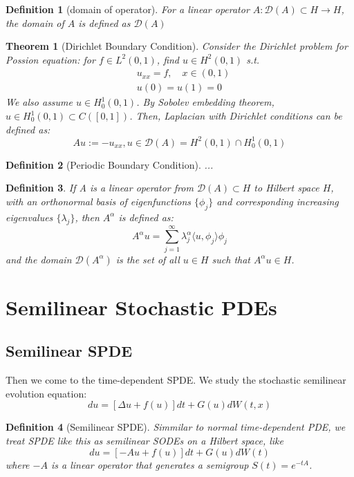 \documentclass{article}
\newtheorem{theorem}{Theorem}
\newtheorem{definition}{Definition}
\begin{document}
\begin{definition}[domain of operator]
    For a linear operator $A:\mathcal{D}(A)\subset H\rightarrow H$, the domain of $A$ is defined as $\mathcal{D}(A)$
\end{definition}
\begin{theorem}[Dirichlet Boundary Condition]
    Consider the Dirichlet problem for Possion equation: for $f\in L^2(0, 1)$, find $u\in H^2(0, 1)$ s.t.
    \begin{equation}
        \begin{aligned}
            &u_{xx} = f, \quad x\in (0, 1)\\
            &u(0) = u(1) = 0
        \end{aligned}
    \end{equation}
    We also assume $u\in H^1_0(0, 1)$. By Sobolev embedding theorem, $u\in H^1_0(0, 1)\subset C([0, 1])$. 
    Then, Laplacian with Dirichlet conditions can be defined as:
    \begin{equation}
        Au:=-u_{xx}, u\in \mathcal{D}(A)=H^2(0,1)\cap H_0^1(0,1)
    \end{equation}
\end{theorem}


\begin{definition}[Periodic Boundary Condition]
    ...
\end{definition}

\begin{definition}
    If A is a linear operator from $\mathcal{D}(A) \subset H$ to Hilbert space $H$, with an orthonormal basis of eigenfunctions $\{\phi_j\}$ 
    and corresponding increasing eigenvalues $\{\lambda_j\}$, 
    then $A^{\alpha}$ is defined as:
    \begin{equation}
        A^{\alpha}u = \sum_{j=1}^\infty \lambda_j^\alpha \langle u, \phi_j\rangle \phi_j
    \end{equation}
    and the domain $\mathcal{D}(A^{\alpha})$ is the set of all $u\in H$ such that $A^{\alpha}u\in H$.
\end{definition}


\section{Semilinear Stochastic PDEs}
\subsection{Semilinear SPDE}
Then we come to the time-dependent SPDE. We study the stochastic semilinear evolution equation:
\begin{equation}
    du = [\Delta u + f(u)]dt + G(u)dW(t, x)
\end{equation}
\begin{definition}[Semilinear SPDE]
    Simmilar to normal time-dependent PDE, we treat SPDE like this as semilinear SODEs on a Hilbert space, like
\begin{equation}
    du = [-Au+f(u)]dt + G(u)dW(t)
\end{equation}
where $-A$ is a linear operator that generates a semigroup $S(t)=e^{-tA}$. 
\end{definition}
\end{document}
